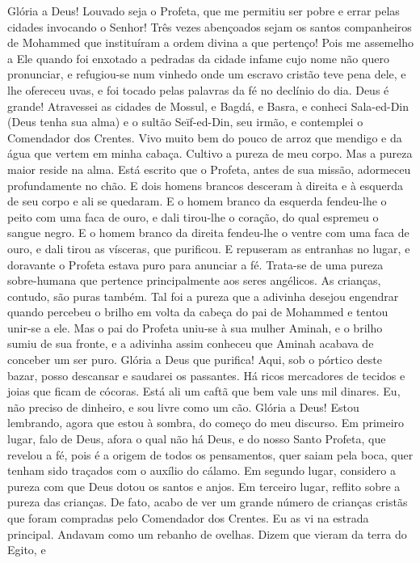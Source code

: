 Glória a Deus!  Louvado seja o Profeta, que me permitiu ser pobre e errar
pelas cidades invocando o Senhor! Três vezes abençoados sejam os santos
companheiros de Mohammed que instituíram a ordem divina a que pertenço!
Pois me assemelho a Ele quando foi enxotado a pedradas da cidade infame
cujo nome não quero pronunciar, e refugiou-se num vinhedo onde um escravo
cristão teve pena dele, e lhe ofereceu uvas, e foi tocado pelas palavras
da fé no declínio do dia. Deus é grande! Atravessei as cidades de Mossul,
e Bagdá, e Basra, e conheci Sala-ed-Din (Deus tenha sua alma) e o sultão
Seïf-ed-Din, seu irmão, e contemplei o Comendador dos Crentes. Vivo muito
bem do pouco de arroz que mendigo e da água que vertem em minha cabaça.
Cultivo a pureza de meu corpo. Mas a pureza maior reside na alma. Está
escrito que o Profeta, antes de sua missão, adormeceu profundamente no
chão. E dois homens brancos desceram à direita e à esquerda de seu corpo e
ali se quedaram. E o homem branco da esquerda fendeu-lhe o peito com uma
faca de ouro, e dali tirou-lhe o coração, do qual espremeu o sangue negro.
E o homem branco da direita fendeu-lhe o ventre com uma faca de ouro, e
dali tirou as vísceras, que purificou. E repuseram as entranhas no lugar, e
doravante o Profeta estava puro para anunciar a fé. Trata-se de uma pureza
sobre-humana que pertence principalmente aos seres angélicos. As crianças,
contudo, são puras também. Tal foi a pureza que a adivinha desejou
engendrar quando percebeu o brilho em volta da cabeça do pai de Mohammed e
tentou unir-se a ele. Mas o pai do Profeta uniu-se à sua mulher Aminah, e
o brilho sumiu de sua fronte, e a adivinha assim conheceu que Aminah
acabava de conceber um ser puro. Glória a Deus que purifica! Aqui, sob o
pórtico deste bazar, posso descansar e saudarei os passantes. Há ricos
mercadores de tecidos e joias que ficam de cócoras. Está ali um caftã que
bem vale uns mil dinares. Eu, não preciso de dinheiro, e sou livre como um
cão. Glória a Deus! Estou lembrando, agora que estou à sombra, do começo
do meu discurso. Em primeiro lugar, falo de Deus, afora o qual não há
Deus, e do nosso Santo Profeta, que revelou a fé, pois é a origem de todos
os pensamentos, quer saiam pela boca, quer tenham sido traçados com o
auxílio do cálamo. Em segundo lugar, considero a pureza com que Deus dotou
os santos e anjos. Em terceiro lugar, reflito sobre a pureza das crianças.
De fato, acabo de ver um grande número de crianças cristãs que foram
compradas pelo Comendador dos Crentes. Eu as vi na estrada principal.
Andavam como um rebanho de ovelhas. Dizem que vieram da terra do Egito, e
